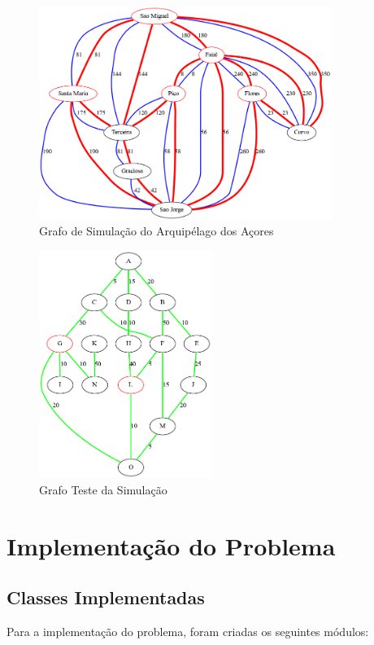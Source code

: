 \documentclass[a4paper,12pt]{scrreprt}
\begin{document}
\begin{figure}[H]
    \centering
    \includegraphics[width=0.85\textwidth]{img/graph_azores.png}
    \caption{Grafo de Simulação do Arquipélago dos Açores}
    \label{fig:graph_azores}
\end{figure}

\begin{figure}[H]
    \centering
    \includegraphics[width=0.5\textwidth]{img/graph_sim_test.png}
    \caption{Grafo Teste da Simulação}
    \label{fig:graph_sim_test}
\end{figure}

\clearpage
{}

\section{Implementação do Problema}

\subsection{Classes Implementadas}
Para a implementação do problema, foram criadas os seguintes módulos:
\end{document}
